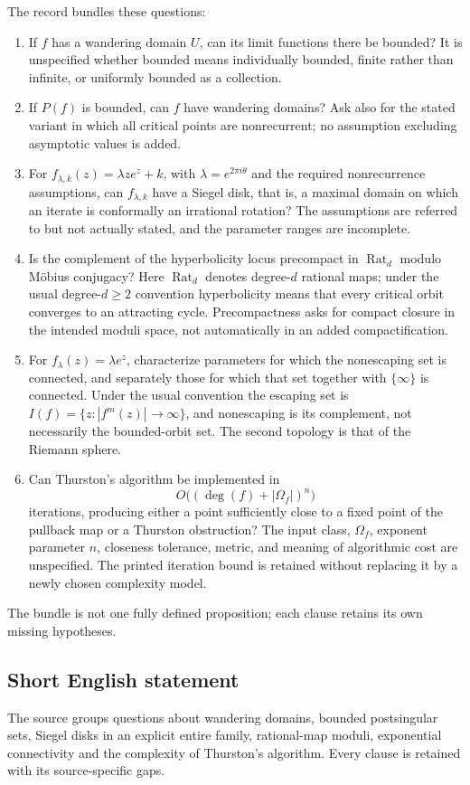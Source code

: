 \documentclass[11pt]{article}
\begin{document}
The record bundles these questions:
\begin{enumerate}
\item If \(f\) has a wandering domain \(U\), can its limit functions there be bounded? It is unspecified whether bounded means individually bounded, finite rather than infinite, or uniformly bounded as a collection.
\item If \(P(f)\) is bounded, can \(f\) have wandering domains? Ask also for the stated variant in which all critical points are nonrecurrent; no assumption excluding asymptotic values is added.
\item For \(f_{\lambda,k}(z)=\lambda z e^z+k\), with \(\lambda=e^{2\pi i\theta}\) and the required nonrecurrence assumptions, can \(f_{\lambda,k}\) have a Siegel disk, that is, a maximal domain on which an iterate is conformally an irrational rotation? The assumptions are referred to but not actually stated, and the parameter ranges are incomplete.
\item Is the complement of the hyperbolicity locus precompact in \(\operatorname{Rat}_d\) modulo Möbius conjugacy? Here \(\operatorname{Rat}_d\) denotes degree-\(d\) rational maps; under the usual degree-\(d\geq2\) convention hyperbolicity means that every critical orbit converges to an attracting cycle. Precompactness asks for compact closure in the intended moduli space, not automatically in an added compactification.
\item For \(f_\lambda(z)=\lambda e^z\), characterize parameters for which the nonescaping set is connected, and separately those for which that set together with \(\{\infty\}\) is connected. Under the usual convention the escaping set is \(I(f)=\{z:|f^m(z)|\to\infty\}\), and nonescaping is its complement, not necessarily the bounded-orbit set. The second topology is that of the Riemann sphere.
\item Can Thurston's algorithm be implemented in
\[
O\bigl((\deg(f)+|\Omega_f|)^n\bigr)
\]
iterations, producing either a point sufficiently close to a fixed point of the pullback map or a Thurston obstruction? The input class, \(\Omega_f\), exponent parameter \(n\), closeness tolerance, metric, and meaning of algorithmic cost are unspecified. The printed iteration bound is retained without replacing it by a newly chosen complexity model.
\end{enumerate}
The bundle is not one fully defined proposition; each clause retains its own missing hypotheses.
\subsection{Short English statement}
The source groups questions about wandering domains, bounded postsingular sets, Siegel disks in an explicit entire family, rational-map moduli, exponential connectivity and the complexity of Thurston's algorithm. Every clause is retained with its source-specific gaps.
\end{document}
